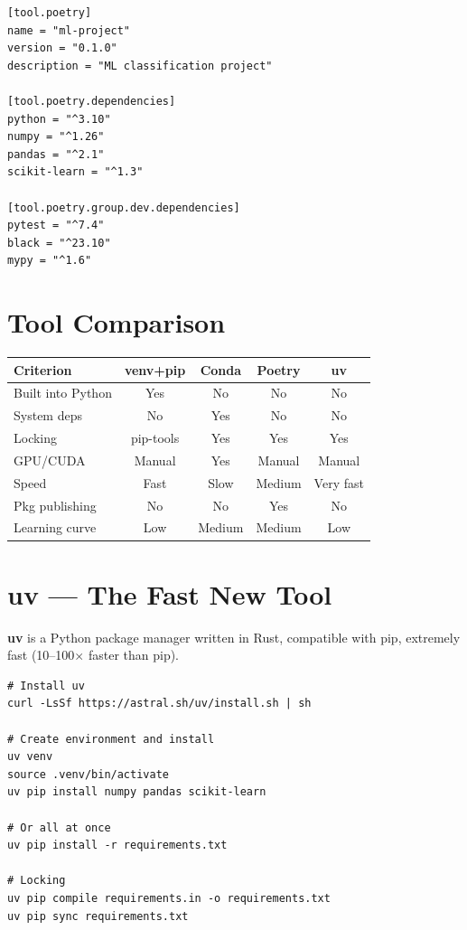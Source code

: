 \begin{codeblock}[title=\textbf{pyproject.toml (excerpt)}]
\begin{verbatim}
[tool.poetry]
name = "ml-project"
version = "0.1.0"
description = "ML classification project"

[tool.poetry.dependencies]
python = "^3.10"
numpy = "^1.26"
pandas = "^2.1"
scikit-learn = "^1.3"

[tool.poetry.group.dev.dependencies]
pytest = "^7.4"
black = "^23.10"
mypy = "^1.6"
\end{verbatim}
\end{codeblock}

\section{Tool Comparison}
\label{sec:env-comparison}

\begin{center}
\begin{tabular}{@{}lcccc@{}}
\toprule
\textbf{Criterion} & \textbf{venv+pip} & \textbf{Conda} & \textbf{Poetry} & \textbf{uv} \\
\midrule
Built into Python & Yes & No & No & No \\
System deps & No & Yes & No & No \\
Locking & pip-tools & Yes & Yes & Yes \\
GPU/CUDA & Manual & Yes & Manual & Manual \\
Speed & Fast & Slow & Medium & Very fast \\
Pkg publishing & No & No & Yes & No \\
Learning curve & Low & Medium & Medium & Low \\
\bottomrule
\end{tabular}
\end{center}

\section{uv --- The Fast New Tool}
\label{sec:uv}

\textbf{uv} is a Python package manager written in Rust, compatible with
pip, extremely fast (10--100$\times$ faster than pip).

\begin{codeblock}[title=\textbf{uv workflow}]
\begin{verbatim}
# Install uv
curl -LsSf https://astral.sh/uv/install.sh | sh

# Create environment and install
uv venv
source .venv/bin/activate
uv pip install numpy pandas scikit-learn

# Or all at once
uv pip install -r requirements.txt

# Locking
uv pip compile requirements.in -o requirements.txt
uv pip sync requirements.txt
\end{verbatim}
\end{codeblock}

